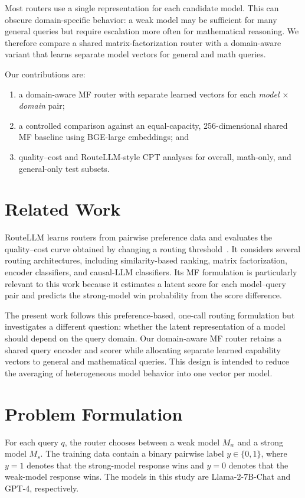 \documentclass[conference]{IEEEtran}
\begin{document}
Most routers use a single representation for each candidate model. This can obscure domain-specific behavior: a weak model may be sufficient for many general queries but require escalation more often for mathematical reasoning. We therefore compare a shared matrix-factorization router with a domain-aware variant that learns separate model vectors for general and math queries.

Our contributions are:
\begin{enumerate}
    \item a domain-aware MF router with separate learned vectors for each \emph{model $\times$ domain} pair;
    \item a controlled comparison against an equal-capacity, 256-dimensional shared MF baseline using BGE-large embeddings; and
    \item quality--cost and RouteLLM-style CPT analyses for overall, math-only, and general-only test subsets.
\end{enumerate}

\section{Related Work}
RouteLLM learns routers from pairwise preference data and evaluates the quality--cost curve obtained by changing a routing threshold~\cite{ong2024routellm}. It considers several routing architectures, including similarity-based ranking, matrix factorization, encoder classifiers, and causal-LLM classifiers. Its MF formulation is particularly relevant to this work because it estimates a latent score for each model--query pair and predicts the strong-model win probability from the score difference.

The present work follows this preference-based, one-call routing formulation but investigates a different question: whether the latent representation of a model should depend on the query domain. Our domain-aware MF router retains a shared query encoder and scorer while allocating separate learned capability vectors to general and mathematical queries. This design is intended to reduce the averaging of heterogeneous model behavior into one vector per model.

\section{Problem Formulation}
For each query $q$, the router chooses between a weak model $M_w$ and a strong model $M_s$. The training data contain a binary pairwise label $y \in \{0,1\}$, where $y=1$ denotes that the strong-model response wins and $y=0$ denotes that the weak-model response wins. The models in this study are Llama-2-7B-Chat and GPT-4, respectively.
\end{document}

